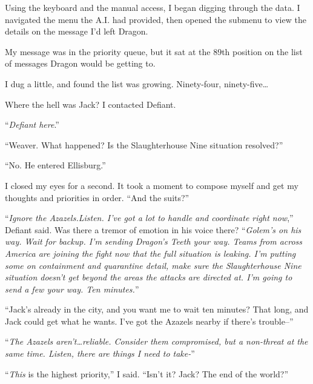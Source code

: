 Using the keyboard and the manual access, I began digging through the data.  I navigated the menu the A.I. had provided, then opened the submenu to view the details on the message I'd left Dragon.



My message was in the priority queue, but it sat at the 89th position on the list of messages Dragon would be getting to.



I dug a little, and found the list was growing.  Ninety-four, ninety-five\ldots



Where the hell was Jack?  I contacted Defiant.



``\emph{Defiant here}.''



``Weaver.  What happened?  Is the Slaughterhouse Nine situation resolved?''



``No.  He entered Ellisburg.''



I closed my eyes for a second.  It took a moment to compose myself and get my thoughts and priorities in order.  ``And the suits?''



``\emph{Ignore the Azazels.}\emph{Listen.  I've got a lot to handle and coordinate right now},'' Defiant said.  Was there a tremor of emotion in his voice there?  ``\emph{Golem's on his way.  Wait for backup.  I'm sending Dragon's Teeth your way.  Teams from across America are joining the fight now that the full situation is leaking. I'm putting some on containment and quarantine detail, make sure the Slaughterhouse Nine situation doesn't get beyond the areas the attacks are directed at.  I'm going to send a few your way.  Ten minutes.}''



``Jack's already in the city, and you want me to wait ten minutes?  That long, and Jack could get what he wants.  I've got the Azazels nearby if there's trouble--''



``\emph{The Azazels aren't\ldots reliable.  Consider them compromised, but a non-threat at the same time.  Listen, there are things I need to take-}''



``\emph{This} is the highest priority,'' I said.  ``Isn't it?  Jack?  The end of the world?''



